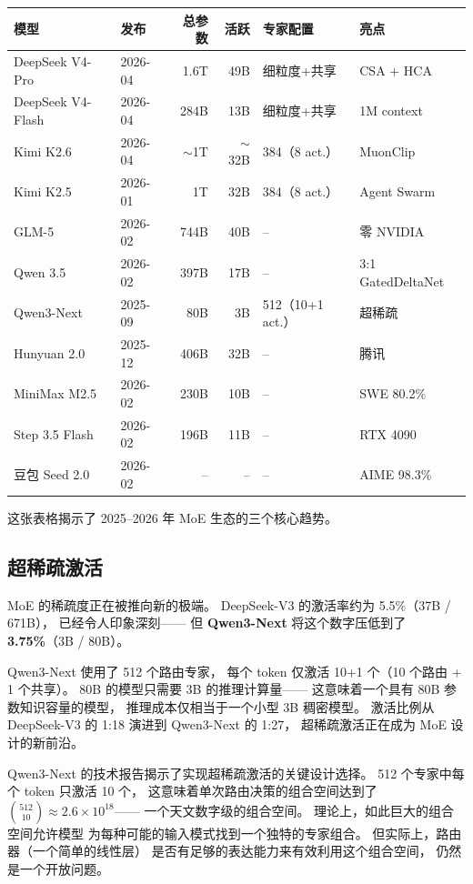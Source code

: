 \begin{center}\small
\renewcommand{\arraystretch}{1.3}
\begin{tabular}{llrrll}
  \toprule
  \rowcolor{figLightGray}
  \textbf{模型} & \textbf{发布} & \textbf{总参数} & \textbf{活跃}
  & \textbf{专家配置} & \textbf{亮点} \\
  \midrule
  DeepSeek V4-Pro & 2026-04 & 1.6T & 49B
  & 细粒度+共享 & CSA + HCA \\
  DeepSeek V4-Flash & 2026-04 & 284B & 13B
  & 细粒度+共享 & 1M context \\
  Kimi K2.6 & 2026-04 & $\sim$1T & $\sim$32B
  & 384（8 act.） & MuonClip \\
  Kimi K2.5 & 2026-01 & 1T & 32B
  & 384（8 act.） & Agent Swarm \\
  GLM-5 & 2026-02 & 744B & 40B
  & -- & 零 NVIDIA \\
  Qwen 3.5 & 2026-02 & 397B & 17B
  & -- & 3:1 GatedDeltaNet \\
  Qwen3-Next & 2025-09 & 80B & 3B
  & 512（10+1 act.） & 超稀疏 \\
  Hunyuan 2.0 & 2025-12 & 406B & 32B
  & -- & 腾讯 \\
  MiniMax M2.5 & 2026-02 & 230B & 10B
  & -- & SWE 80.2\% \\
  Step 3.5 Flash & 2026-02 & 196B & 11B
  & -- & RTX 4090 \\
  豆包 Seed 2.0 & 2026-02 & -- & --
  & -- & AIME 98.3\% \\
  \bottomrule
\end{tabular}
\end{center}

这张表格揭示了 2025--2026 年 MoE 生态的三个核心趋势。

\subsection{超稀疏激活}

MoE 的稀疏度正在被推向新的极端。
DeepSeek-V3 的激活率约为 5.5\%（37B / 671B），
已经令人印象深刻——
但 \textbf{Qwen3-Next} 将这个数字压低到了
\textbf{3.75\%}（3B / 80B）。

Qwen3-Next 使用了 512 个路由专家，
每个 token 仅激活 10+1 个（10 个路由 + 1 个共享）。
80B 的模型只需要 3B 的推理计算量——
这意味着一个具有 80B 参数知识容量的模型，
推理成本仅相当于一个小型 3B 稠密模型。
激活比例从 DeepSeek-V3 的 1:18 演进到 Qwen3-Next 的 1:27，
超稀疏激活正在成为 MoE 设计的新前沿。

Qwen3-Next 的技术报告揭示了实现超稀疏激活的关键设计选择。
512 个专家中每个 token 只激活 10 个，
这意味着单次路由决策的组合空间达到了
$\binom{512}{10} \approx 2.6 \times 10^{18}$——
一个天文数字级的组合空间。
理论上，如此巨大的组合空间允许模型
为每种可能的输入模式找到一个独特的专家组合。
但实际上，路由器（一个简单的线性层）
是否有足够的表达能力来有效利用这个组合空间，
仍然是一个开放问题。

